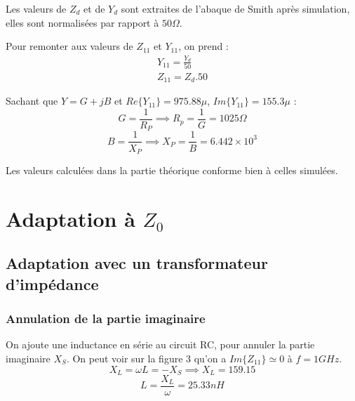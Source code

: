 \documentclass[a4paper]{article}
\begin{document}
Les valeurs de $Z_{d}$ et de $Y_{d}$ sont extraites de l'abaque de Smith apr\`es simulation, elles sont normalis\'ees par rapport
\`a $50 \Omega$.

Pour remonter aux valeurs de $Z_{11}$ et $Y_{11}$, on prend :
\begin{equation}
  \begin{split}
    Y_{11} = \frac{Y_d}{50} \\
    Z_{11} = Z_{d}.50
  \end{split}
\end{equation}

Sachant que $ Y = G + j B $ et $Re\{Y_{11}\} = 975.88 \mu $, $Im\{Y_{11}\}= 155.3 \mu$ :
\[
G = \frac{1}{R_P} \implies R_p = \frac{1}{G} = 1025 \Omega
\]
\[
B = \frac{1}{X_P} \implies X_P = \frac{1}{B} = 6.442 \times 10^3
\]

Les valeurs calcul\'ees dans la partie th\'eorique conforme bien \`a celles simul\'ees.

\section{Adaptation \`a $Z_0$}

\subsection{Adaptation avec un transformateur d'imp\'edance}
\subsubsection{Annulation de la partie imaginaire}
On ajoute une inductance en s\'erie au circuit RC, pour annuler la partie imaginaire $X_S$.
On peut voir sur la figure 3 qu'on a $Im\{Z_{11}\} \simeq 0 $ \`a $f=1 GHz$.
\[
X_L = \omega L = - X_S \implies X_L = 159.15
\]
\[
L = \frac{X_L}{\omega} = 25.33 nH
\]
\end{document}
